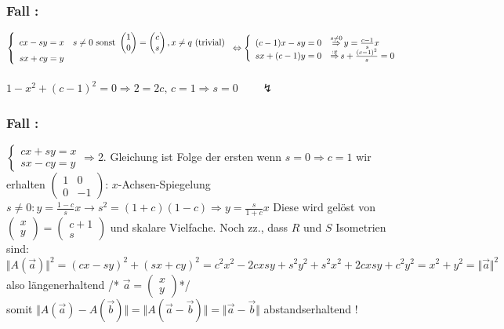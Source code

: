\subsubsection{Fall :} 
$
\left\{
\begin{array}{c l}     
    cx-sy=x  & s \neq 0 \text{ sonst } \begin{pmatrix} 1 \\ 0 \end{pmatrix}= \begin{pmatrix} c \\ s \end{pmatrix}, x \neq q \text{ (trivial)}\\
    sx+cy = y &
\end{array}\right.
\Leftrightarrow
\left\{
\begin{array}{c l}     
 (c-1)x - sy = 0 & \mathop{\Rightarrow}\limits^{s\neq 0} y = \frac{c-1}{s}x \\
    sx + (c-1)y=0 & \mathop{\Rightarrow}\limits^{:x} s + \frac{(c-1)^{2}}{s}=0
\end{array}\right.$\\
\quad\\
$1-x^{2} + (c-1)^{2} = 0 \Rightarrow 2 = 2c, \, c=1\Rightarrow s = 0 \qquad\lightning$
%
%
%
\subsubsection{Fall :}
$\begin{cases} 
cx + sy = x  \\ 
sx -cy = y
\end{cases}
\Rightarrow $2. Gleichung ist Folge der ersten wenn $s = 0 \Rightarrow c = 1$ wir erhalten $\begin{pmatrix} 1 & 0 \\ 0 & -1 \end{pmatrix}$: $x$-Achsen-Spiegelung\\
$s \neq 0: y = \frac{1-c}{s}x\rightarrow s^{2} = (1+c)(1-c)\Rightarrow y=\frac{s}{1+c}x$ Diese wird gelöst von\\
$\begin{pmatrix} x \\ y \end{pmatrix} = \begin{pmatrix} c+1 \\ s \end{pmatrix}$ und skalare Vielfache. Noch zz., dass $R$ und $S$ Isometrien sind:\\
$\Vert A(\vec{a})\Vert^{2} = (cx-sy)^{2}+(sx+cy)^{2} = c^{2}x^{2}-2cxsy+s^{2}y^{2}+s^{2}x^{2}+2cxsy + c^{2} y^{2} = x^{2}+y^{2}=\Vert\vec{a}\Vert^{2}$ also längenerhaltend /* $\vec{a}=\begin{pmatrix} x \\ y \end{pmatrix}$*/\\
somit $\Vert A(\vec{a})-A(\vec{b})\Vert = \Vert A(\vec{a}-\vec{b})\Vert = \Vert \vec{a}-\vec{b}\Vert$ abstandserhaltend !\\
%
%
%
